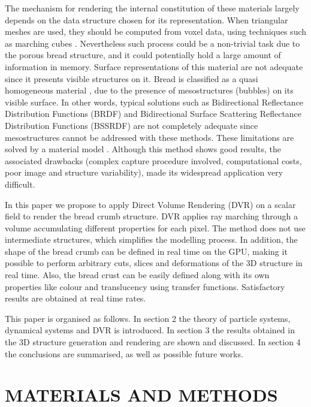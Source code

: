 \documentclass[oneside,a4paper,english,links]{amca}
\begin{document}
The mechanism for rendering the internal constitution of these materials largely depends
on the data structure chosen for its representation. When triangular
meshes are used, they should be computed from voxel data, using
techniques such as marching cubes \citep{Lorensen1987}. Nevertheless
such process could be a non-trivial task due to the porous bread structure, and it
could potentially hold a large amount of information in memory. Surface representations
of this material are not adequate since it presents visible structures on it.
Bread is classified as a quasi homogeneous material \citep{Tong2005}, due to the presence
of mesostructures (bubbles) on its visible surface. In other words, typical solutions such as
Bidirectional Reflectance Distribution Functions (BRDF)
\citep{Kurt2009} and Bidirectional Surface Scattering Reflectance
Distribution Functions (BSSRDF) \citep{Donner2009} are not completely
adequate since mesostructures cannot be addressed with these
methods. These limitations are solved by a material model \citep{Tong2005}. Although this method shows good results, the associated drawbacks (complex capture procedure
involved, computational costs, poor image and structure variability),
made its widespread application very difficult.

In this paper we propose to apply Direct Volume Rendering (DVR)
\citep{Levoy1988,Kruger2003, Kratz2006} on a scalar field to render
the bread crumb structure. DVR applies ray marching through a volume
accumulating different properties for each pixel. The method does not
use intermediate structures, which simplifies the modelling
process. In addition, the shape of the bread crumb can be defined in
real time on the GPU, making it possible to perform arbitrary cuts,
slices and deformations of the 3D structure in real time. Also, the
bread crust can be easily defined along with its own properties like
colour and translucency using transfer functions. Satisfactory results
are obtained at real time rates.

This paper is organised as follows. In section 2 the theory of
particle systems, dynamical systems and DVR is introduced. In section
3 the results obtained in the 3D structure generation and rendering
are shown and discussed. In section 4 the conclusions are summarised,
as well as possible future works.

\section{MATERIALS AND METHODS}
\end{document}
